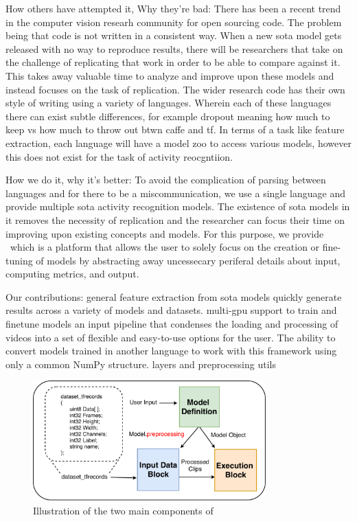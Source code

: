 \documentclass{llncs}
\begin{document}
How others have attempted it, Why they're bad:
There has been a recent trend in the computer vision researh community for open sourcing code.
The problem being that code is not written in a consistent way.
When a new sota model gets released with no way to reproduce results, there will be researchers that take on the challenge of replicating that work in order to be able to compare against it.
This takes away valuable time to analyze and improve upon these models and instead focuses on the task of replication.
The wider research code has their own style of writing using a variety of languages.
Wherein each of these languages there can exist subtle differences, for example dropout meaning how much to keep vs how much to throw out btwn caffe and tf.
In terms of a task like feature extraction, each language will have a model zoo to access various models, however this does not exist for the task of activity reocgntiion.



How we do it, why it's better:
To avoid the complication of parsing between languages and for there to be a miscommunication, we use a single language and provide multiple sota activity recognition models.
The existence of sota models in it removes the necessity of replication and the researcher can focus their time on improving upon existing concepts and models.
For this purpose, we provide \acro~which is a platform that allows the user to solely focus on the creation or fine-tuning of models by abstracting away uncessecary periferal details about input, computing metrics, and output.



Our contributions:
general feature extraction from sota models
quickly generate results across a variety of models and datasets.
multi-gpu support to train and finetune models
an input pipeline that condenses the loading and processing of videos into a set of flexible and easy-to-use options for the user.
The ability to convert models trained in another language to work with this framework using only a common NumPy structure.
layers and preprocessing utils 

\begin{figure}[b!]
\centering
\includegraphics[width=0.8\textwidth]{images/overview.pdf}
\caption{Illustration of the two main components of \acro}
\label{fig:overview}
\end{figure}
\end{document}
